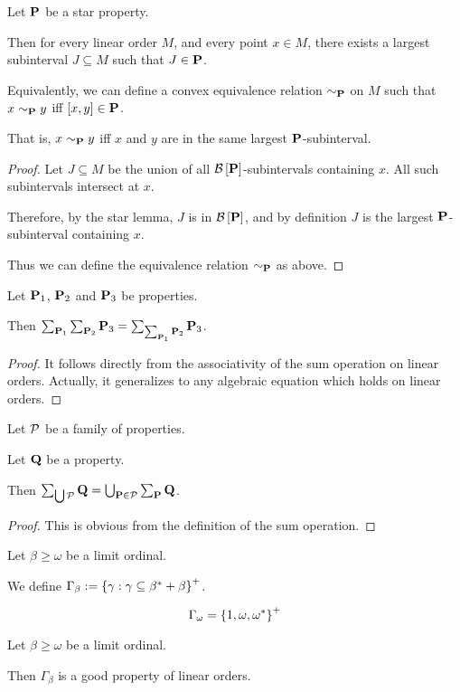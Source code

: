 \begin{lemma}
  Let $\mathbf{P}$ be a star property.

  Then for every linear order $M$,
  and every point $x \in M$, there exists a largest subinterval $J \subseteq M$ such that
  $J \in \mathbf{P}$.

  Equivalently, we can define a convex equivalence relation $\sim_{\mathbf{P}}$ on $M$ such that $x \sim_{\mathbf{P}} y$ iff $[x, y] \in \mathbf{P}$.

  That is,
  $x \sim_{\mathbf{P}} y$ iff $x$ and $y$ are in the same largest $\mathbf{P}$-subinterval.

\end{lemma}

\begin{proof}
  Let $J \subseteq M$ be the union of all $\mathcal{B} \left[ {{\mathbf{P}}} \right]$-subintervals containing $x$.
  All such subintervals intersect at $x$.

  Therefore, by the star lemma, $J$ is in $\mathcal{B} \left[ {{\mathbf{P}}} \right]$, and by definition
  $J$ is the largest $\mathbf{P}$-subinterval containing $x$.

  Thus we can define the equivalence relation $\sim_{\mathbf{P}}$ as above.
\end{proof}

\begin{lemma}
  Let $\mathbf{P}_1$, $\mathbf{P}_2$ and $\mathbf{P}_3$ be properties.

  Then $\sum_{\mathbf{P}_1}{\sum_{\mathbf{P}_2}{\mathbf{P}_3}} = \sum_{\sum_{\mathbf{P}_1}{\mathbf{P}_2}}{\mathbf{P}_3}$.
\end{lemma}

\begin{proof}
  It follows directly from the associativity of the sum operation on
  linear orders. Actually, it generalizes to any algebraic equation
  which holds on linear orders.
\end{proof}

\begin{lemma}
  Let $\mathcal{P}$ be a family of properties.

  Let $\mathbf{Q}$ be a property.

  Then $\sum_{\bigcup \mathcal{P}}{\mathbf{Q}} = \bigcup_{\mathbf{P} \in \mathcal{P}}{\sum_{\mathbf{P}}{\mathbf{Q}}}$.
\end{lemma}

\begin{proof}
  This is obvious from the definition of the sum operation.
\end{proof}


\begin{definition}
  Let $\beta \ge \omega$ be a limit ordinal.

  We define $\Gamma_{\beta} := \left\{ {\gamma : \gamma \subseteq \beta^\ast + \beta} \right\}^+$.
\end{definition}

\begin{example}
  \[
    \Gamma_{\omega} = \left\{ {1, \omega, \omega^\ast} \right\}^+
  \]
\end{example}

\begin{observation}
  Let $\beta \ge \omega$ be a limit ordinal.

  Then $\Gamma_{\beta}$ is a good property of linear orders.
\end{observation}
